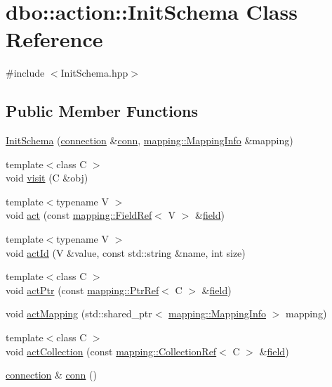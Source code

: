 \hypertarget{classdbo_1_1action_1_1_init_schema}{\section{dbo\+:\+:action\+:\+:Init\+Schema Class Reference}
\label{classdbo_1_1action_1_1_init_schema}
}


{\ttfamily \#include $<$Init\+Schema.\+hpp$>$}

\subsection*{Public Member Functions}
\begin{DoxyCompactItemize}
\item 
\hyperlink{classdbo_1_1action_1_1_init_schema_ab202326a714f64529100ec64bf059760}{Init\+Schema} (\hyperlink{classdbo_1_1connection}{connection} \&\hyperlink{classdbo_1_1action_1_1_init_schema_a0b782c8def650dbd4441772195b03492}{conn}, \hyperlink{classdbo_1_1mapping_1_1_mapping_info}{mapping\+::\+Mapping\+Info} \&mapping)
\item 
{\footnotesize template$<$class C $>$ }\\void \hyperlink{classdbo_1_1action_1_1_init_schema_adfae1ff501fbdf81e387c4cd991b5a42}{visit} (C \&obj)
\item 
{\footnotesize template$<$typename V $>$ }\\void \hyperlink{classdbo_1_1action_1_1_init_schema_a6076b6fb441464fd9d6fa60f9488f2c8}{act} (const \hyperlink{classdbo_1_1mapping_1_1_field_ref}{mapping\+::\+Field\+Ref}$<$ V $>$ \&\hyperlink{namespacedbo_ad1f50f02cb050acf946807959252a93f}{field})
\item 
{\footnotesize template$<$typename V $>$ }\\void \hyperlink{classdbo_1_1action_1_1_init_schema_a4e2ac2c5db7bafc7fd74b5b21ef03262}{act\+Id} (V \&value, const std\+::string \&name, int size)
\item 
{\footnotesize template$<$class C $>$ }\\void \hyperlink{classdbo_1_1action_1_1_init_schema_a914f97b32c22273e752327dadd79207f}{act\+Ptr} (const \hyperlink{classdbo_1_1mapping_1_1_ptr_ref}{mapping\+::\+Ptr\+Ref}$<$ C $>$ \&\hyperlink{namespacedbo_ad1f50f02cb050acf946807959252a93f}{field})
\item 
void \hyperlink{classdbo_1_1action_1_1_init_schema_abe965396a6ce1ea4b563f44ea1b2bbf3}{act\+Mapping} (std\+::shared\+\_\+ptr$<$ \hyperlink{classdbo_1_1mapping_1_1_mapping_info}{mapping\+::\+Mapping\+Info} $>$ mapping)
\item 
{\footnotesize template$<$class C $>$ }\\void \hyperlink{classdbo_1_1action_1_1_init_schema_a0ee69f9eea4b8c182c2cad4f42901880}{act\+Collection} (const \hyperlink{classdbo_1_1mapping_1_1_collection_ref}{mapping\+::\+Collection\+Ref}$<$ C $>$ \&\hyperlink{namespacedbo_ad1f50f02cb050acf946807959252a93f}{field})
\item 
\hyperlink{classdbo_1_1connection}{connection} \& \hyperlink{classdbo_1_1action_1_1_init_schema_a0b782c8def650dbd4441772195b03492}{conn} ()
\end{DoxyCompactItemize}


